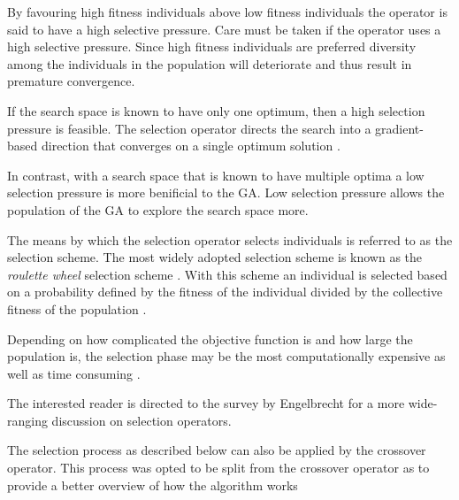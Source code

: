 By favouring high fitness individuals above low fitness individuals the operator is said to have a high selective pressure\cite{CompuIntelligenceIntro}. Care must be taken if the operator uses a high selective pressure. Since high fitness individuals are preferred diversity among the individuals in the population will deteriorate and thus result in premature convergence\cite{ConstrainedGA, CompuIntelligenceIntro}.

If the search space is known to have only one optimum, then a high selection pressure is feasible\cite{ConstrainedGA}. The selection operator directs the search into a gradient-based direction that converges on a single optimum solution \cite{ConstrainedGA}. 

In contrast, with a search space that is known to have multiple optima a low selection pressure is more benificial to the \gls{GA}\cite{ConstrainedGA}. Low selection pressure allows the population of the \gls{GA} to explore the search space more\cite{ConstrainedGA}.

The means by which the selection operator selects individuals is referred to as the selection scheme. The most widely adopted selection scheme is known as the \emph{roulette wheel} selection scheme \cite{ConstrainedGA,GeostatisticalGA,HybridBaldwinGA,CoactiveFuzzyGA}. With this scheme an individual is selected based on a probability defined by the fitness of the individual divided by the collective fitness of the population \cite{GeostatisticalGA}.

Depending on how complicated the objective function is and how large the population is, the selection phase may be the most computationally expensive as well as time consuming \cite{AcceleratingGA}.

The interested reader is directed to the survey by Engelbrecht\cite{CompuIntelligenceIntro} for a more wide-ranging discussion on selection operators.

The selection process as described below  can also be applied by the crossover operator. This process was opted to be split from the crossover operator as to provide a better overview of how the algorithm works

